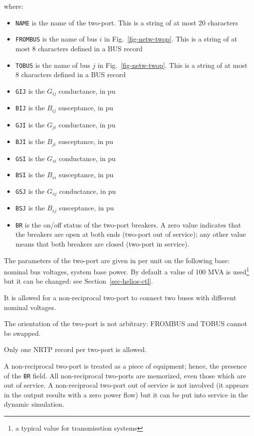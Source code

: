 where:
\begin{itemize}
\item {\tt NAME} is the name of the two-port.  This is a string of at most 20 characters
\item {\tt FROMBUS} is the name of bus $i$ in Fig.~\ref{fig-netw-twop}. This is a string of at most 8 characters defined in a BUS record
\item {\tt TOBUS} is the name of bus $j$ in Fig.~\ref{fig-netw-twop}. This is a string of at most 8 characters defined in a BUS record
\item{\tt GIJ} is the $G_{ij}$ conductance, in pu
\item{\tt BIJ} is the $B_{ij}$ susceptance, in pu
\item{\tt GJI} is the $G_{ji}$ conductance, in pu
\item{\tt BJI} is the $B_{ji}$ susceptance, in pu
\item{\tt GSI} is the $G_{si}$ conductance, in pu
\item{\tt BSI} is the $B_{si}$ susceptance, in pu
\item{\tt GSJ} is the $G_{sj}$ conductance, in pu
\item{\tt BSJ} is the $B_{sj}$ susceptance, in pu
\item{\tt BR} is the on/off status of the two-port breakers. A zero value indicates that the breakers are open at both ends (two-port out of service); any other value means that both breakers are closed (two-port in service).
\end{itemize}

The parameters of the two-port are given in per unit on the following base: nominal bus voltages, system base power. By default a value of 100 MVA is used\footnote{a typical value for transmisstion systems} but it can be changed: see Section~\ref{sec-helios-ctl}.

It is allowed for a non-reciprocal two-port to connect two buses with different nominal voltages.

The orientation of the two-port is not arbitrary: FROMBUS and TOBUS cannot be swapped.

Only one NRTP record per two-port is allowed.

A non-reciprocal two-port is treated as a piece of equipment; hence, the presence of the {\tt BR} field. All non-reciprocal two-ports are memorized, even those which are out of service. A non-reciprocal two-port out of service is not involved (it appears in the output results with a zero power flow) but it can be put into service in the dynamic simulation.

